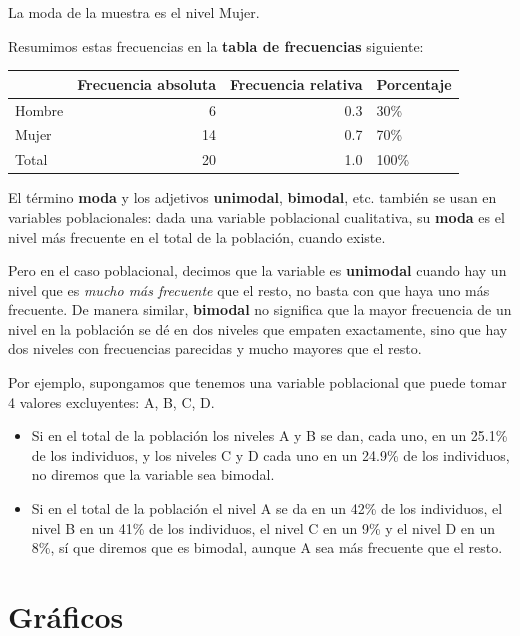 \documentclass[
]{book}
\theoremstyle{definition}
\theoremstyle{definition}
\theoremstyle{definition}
\theoremstyle{definition}
\theoremstyle{remark}
\begin{document}
La moda de la muestra es el nivel Mujer.

Resumimos estas frecuencias en la \textbf{tabla de frecuencias} siguiente:

\begin{tabular}{l|r|r|l}
\hline
  & Frecuencia absoluta & Frecuencia relativa & Porcentaje\\
\hline
Hombre & 6 & 0.3 & 30\%\\
\hline
Mujer & 14 & 0.7 & 70\%\\
\hline
Total & 20 & 1.0 & 100\%\\
\hline
\end{tabular}

\begin{rmdnote}
El término \textbf{moda} y los adjetivos \textbf{unimodal}, \textbf{bimodal}, etc. también se usan en variables poblacionales: dada una variable poblacional cualitativa, su \textbf{moda} es el nivel más frecuente en el total de la población, cuando existe.

Pero en el caso poblacional, decimos que la variable es \textbf{unimodal} cuando hay un nivel que es \emph{mucho más frecuente} que el resto, no basta con que haya uno más frecuente. De manera similar, \textbf{bimodal} no significa que la mayor frecuencia de un nivel en la población se dé en dos niveles que empaten exactamente, sino que hay dos niveles con frecuencias parecidas y mucho mayores que el resto.

Por ejemplo, supongamos que tenemos una variable poblacional que puede tomar 4 valores excluyentes: A, B, C, D.

\begin{itemize}
\item
  Si en el total de la población los niveles A y B se dan, cada uno, en un 25.1\% de los individuos, y los niveles C y D cada uno en un 24.9\% de los individuos, no diremos que la variable sea bimodal.
\item
  Si en el total de la población el nivel A se da en un 42\% de los individuos, el nivel B en un 41\% de los individuos, el nivel C en un 9\% y el nivel D en un 8\%, sí que diremos que es bimodal, aunque A sea más frecuente que el resto.
\end{itemize}
\end{rmdnote}

\hypertarget{gruxe1ficos}{%
\section{Gráficos}\label{gruxe1ficos}}
\end{document}
